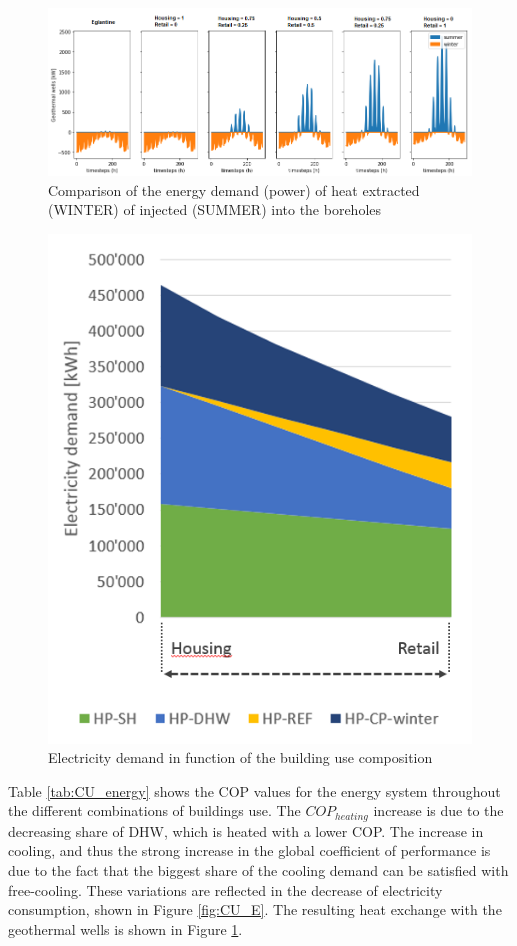 \documentclass{article}
\begin{document}
\begin{figure}[htp]
	\centering
	\includegraphics[width=1\textwidth]{CU_gtw.png}
	\caption{Comparison of the energy demand (power) of heat extracted (WINTER) of injected (SUMMER) into the boreholes}
	\label{fig:CU_gtw}
\end{figure}


\begin{figure}[tph]
	\centering
	\includegraphics[width=0.65\linewidth]{Images/CU_el}
	\caption{Electricity demand in function of the building use composition}
	\label{fig:CU_el}
\end{figure}

Table \ref{tab:CU_energy} shows the COP values for the energy system throughout the different combinations of buildings use. The $COP_{heating}$ increase is due to the decreasing share of DHW, which is heated with a lower COP. The increase in cooling, and thus the strong increase in the global coefficient of performance is due to the fact that the biggest share of the cooling demand can be satisfied with free-cooling. These variations are reflected in the decrease of electricity consumption, shown in Figure \ref{fig:CU_E}. The resulting heat exchange with the geothermal wells is shown in Figure \ref{fig:CU_gtw}.
\end{document}
